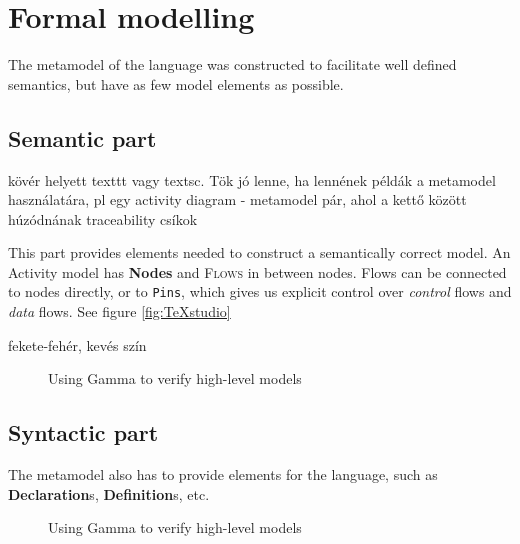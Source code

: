 \clearpage\section{Formal modelling}

The metamodel of the language was constructed to facilitate well defined semantics, but have as few model elements as possible.

\subsection{Semantic part}

kövér helyett texttt vagy textsc. Tök jó lenne, ha lennének példák a metamodel használatára, pl egy activity diagram - metamodel pár, ahol a kettő között húzódnának traceability csíkok

This part provides elements needed to construct a semantically correct model. An Activity model has \textbf{Nodes} and \textsc{Flows} in between nodes. Flows can be connected to nodes directly, or to \texttt{Pins}, which gives us explicit control over \emph{control} flows and \emph{data} flows. See figure \ref{fig:TeXstudio}

fekete-fehér, kevés szín

\begin{figure}[!ht]
	\centering
	
	\caption{Using Gamma to verify high-level models}
	\label{fig:semantic}
\end{figure}

\subsection{Syntactic part}

The metamodel also has to provide elements for the language, such as \textbf{Declaration}s, \textbf{Definition}s, etc.

\begin{figure}[!ht]
	\centering
	
	\caption{Using Gamma to verify high-level models}
	\label{fig:syntactic}
\end{figure}

